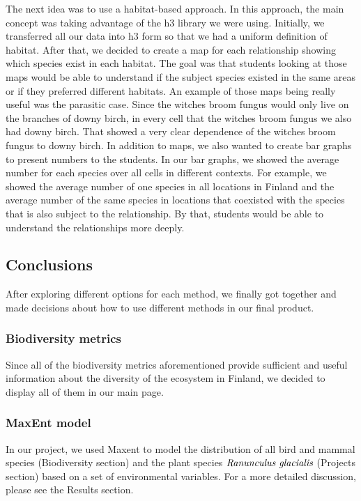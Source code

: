 \documentclass{article}
\begin{document}
\par
The next idea was to use a habitat-based approach. In this approach, the main concept was taking advantage of the h3 library we were using. Initially, we transferred all our data into h3 form so that we had a uniform definition of habitat. After that, we decided to create a map for each relationship showing which species exist in each habitat. The goal was that students looking at those maps would be able to understand if the subject species existed in the same areas or if they preferred different habitats. An example of those maps being really useful was the parasitic case. Since the witches broom fungus would only live on the branches of downy birch, in every cell that the witches broom fungus we also had downy birch. That showed a very clear dependence of the witches broom fungus to downy birch. In addition to maps, we also wanted to create bar graphs to present numbers to the students. In our bar graphs, we showed the average number for each species over all cells in different contexts. For example, we showed the average number of one species in all locations in Finland and the average number of the same species in locations that coexisted with the species that is also subject to the relationship. By that, students would be able to understand the relationships more deeply.
\subsection{Conclusions}
After exploring different options for each method, we finally got together and made decisions about how to use different methods in our final product.
\subsubsection{Biodiversity metrics}
Since all of the biodiversity metrics aforementioned provide sufficient and useful information about the diversity of the ecosystem in Finland, we decided to display all of them in our main page.
\subsubsection{MaxEnt model}
In our project, we used Maxent to model the distribution of all bird and mammal species (Biodiversity section) and the plant species $\emph{Ranunculus glacialis}$ (Projects section) based on a set of environmental variables. For a more detailed discussion, please see the Results section.
\end{document}
